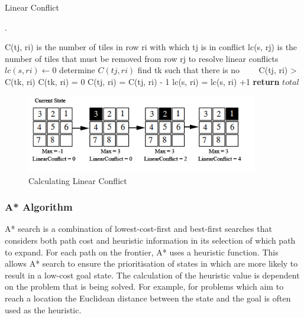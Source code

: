 \documentclass[final]{cmpreport}
\begin{document}
\begin{algorithm}
	\caption{Linear Conflict}\label{Linear Conflict}\cite{hansson1992criticizing}.
	\begin{algorithmic}[1]
		\State C(tj, ri) is the number of tiles in row ri with which tj is in conflict
		\State lc(s, rj) is the number of tiles that must be removed from row rj to resolve linear conflicts
			
			\State $lc(s, ri)\gets 0$
				\State determine $C(tj, ri)$
					\State find tk such that there is no
					\State \ \ \ \  C(tj, ri) > C(tk, ri)
					\State C(tk, ri) = 0 
						\State C(tj, ri) = C(tj, ri) - 1 
					\EndFor
					\State lc(s, ri) = lc(s, ri) +1	
				\EndWhile
			\EndFor
		\EndFor
		\State \textbf{return} $total$
		\EndProcedure
	\end{algorithmic}
\end{algorithm}


\begin{figure}[ht]
	\centering
	\includegraphics[width=0.9\textwidth]{linear}
	\captionsetup{justification=centering}
	\caption{Calculating Linear Conflict}
\end{figure}



\subsubsection{A* Algorithm}
A* search is a combination of lowest-cost-first and best-first searches that considers both path cost and heuristic information in its selection of which path to expand. For each path on the frontier, A* uses a heuristic function. This allows A* search to ensure the prioritisation of states in which are more likely to result in a low-cost goal state. The calculation of the heuristic value is dependent on the problem that is being solved. For example, for problems which aim to reach a location the Euclidean distance between the state and the goal is often used as the heuristic. 
\end{document}

